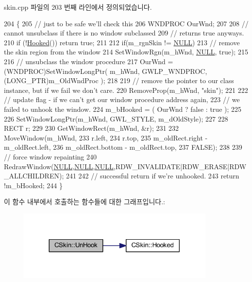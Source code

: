 skin.\+cpp 파일의 203 번째 라인에서 정의되었습니다.


\begin{DoxyCode}
204 \{
205   \textcolor{comment}{// just to be safe we'll check this}
206   WNDPROC OurWnd;
207 
208   \textcolor{comment}{// cannot unsubclass if there is no window subclassed}
209   \textcolor{comment}{// returns true anyways.}
210   \textcolor{keywordflow}{if} (!\mbox{\hyperlink{class_c_skin_a99b438d858bbafa83569f19e707ba3c9}{Hooked}}()) \textcolor{keywordflow}{return} \textcolor{keyword}{true};
211   
212   \textcolor{keywordflow}{if}(m\_rgnSkin != \mbox{\hyperlink{getopt1_8c_a070d2ce7b6bb7e5c05602aa8c308d0c4}{NULL}})
213     \textcolor{comment}{// remove the skin region from the window}
214     SetWindowRgn(m\_hWnd, \mbox{\hyperlink{getopt1_8c_a070d2ce7b6bb7e5c05602aa8c308d0c4}{NULL}}, \textcolor{keyword}{true});
215 
216   \textcolor{comment}{// unsubclass the window procedure}
217   OurWnd = (WNDPROC)SetWindowLongPtr( m\_hWnd, GWLP\_WNDPROC, (LONG\_PTR)m\_OldWndProc );
218 
219   \textcolor{comment}{// remove the pointer to our class instance, but if we fail we don't care.}
220   RemoveProp(m\_hWnd, \textcolor{stringliteral}{"skin"});
221 
222   \textcolor{comment}{// update flag - if we can't get our window procedure address again,}
223   \textcolor{comment}{// we failed to unhook the window.}
224   m\_bHooked = ( OurWnd ? false : true );
225 
226   SetWindowLongPtr(m\_hWnd, GWL\_STYLE, m\_dOldStyle);
227 
228   RECT r;
229 
230   GetWindowRect(m\_hWnd, &r);
231   
232   MoveWindow(m\_hWnd,
233              r.left,
234              r.top,
235              m\_oldRect.right - m\_oldRect.left,
236              m\_oldRect.bottom - m\_oldRect.top,
237              FALSE);
238   
239   \textcolor{comment}{// force window repainting}
240   RedrawWindow(\mbox{\hyperlink{getopt1_8c_a070d2ce7b6bb7e5c05602aa8c308d0c4}{NULL}},\mbox{\hyperlink{getopt1_8c_a070d2ce7b6bb7e5c05602aa8c308d0c4}{NULL}},\mbox{\hyperlink{getopt1_8c_a070d2ce7b6bb7e5c05602aa8c308d0c4}{NULL}},RDW\_INVALIDATE|RDW\_ERASE|RDW\_ALLCHILDREN);  
241 
242   \textcolor{comment}{// successful return if we're unhooked.}
243   \textcolor{keywordflow}{return} !m\_bHooked;
244 \}
\end{DoxyCode}
이 함수 내부에서 호출하는 함수들에 대한 그래프입니다.\+:
\nopagebreak
\begin{figure}[H]
\begin{center}
\leavevmode
\includegraphics[width=281pt]{class_c_skin_ab8237ed204df8eb4632ef3bc921783a3_cgraph}
\end{center}
\end{figure}
